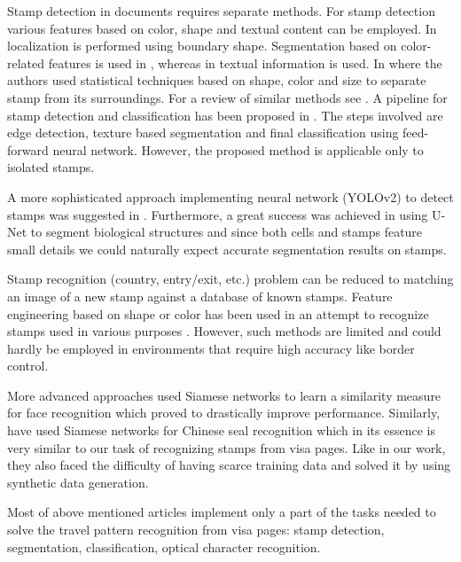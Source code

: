 \documentclass[twocolumn]{svjour3}
\begin{document}
Stamp detection in documents requires separate methods. For stamp detection various features based on color, shape and textual content can be employed. In \cite{Zhu2006,Roy2011} localization is performed using boundary shape. Segmentation based on color-related features is used in \cite{Micenkov2011,Dey2015}, whereas in \cite{Nandedkar2015,Singh2018} textual information is used. In \cite{ahmed_generic_2013} where the authors used statistical techniques based on shape, color and size to separate stamp from its surroundings. For a review of similar methods see \cite{Alaei2016}. A pipeline for stamp detection and classification has been proposed in \cite{Zaaboub2020}. The steps involved are edge detection, texture based segmentation and final classification using feed-forward neural network. However, the proposed method is applicable only to isolated stamps.

A more sophisticated approach implementing neural network (YOLOv2) to detect stamps was suggested in \cite{smolinski_segmentation_2020}. Furthermore, a great success was achieved in \cite{ronneberger_u-net_2015} using U-Net to segment biological structures and since both cells and stamps feature small details we could naturally expect accurate segmentation results on stamps.

Stamp recognition (country, entry/exit, etc.) problem can be reduced to matching an image of a new stamp against a database of known stamps. Feature engineering based on shape or color has been used in an attempt to recognize stamps used in various purposes \cite{kacprzyk_efficient_2011,Forczmanski2012,Forczmanski2013,Petej2013, forczmanski_stamps_2015}.
However, such methods are limited and could hardly be employed in environments that require high accuracy like border control.

More advanced approaches used Siamese networks to learn a similarity measure for face recognition \cite{taigman_deepface_2014} which proved to drastically improve performance. Similarly, \cite{wang_csrs_2019} have used Siamese networks for Chinese seal recognition which in its essence is very similar to our task of recognizing stamps from visa pages. Like in our work, they also faced the difficulty of having scarce training data and solved it by using synthetic data generation.

Most of above mentioned articles implement only a part of the tasks needed to solve the travel pattern recognition from visa pages:
stamp detection, segmentation, classification, optical character recognition.
\end{document}
